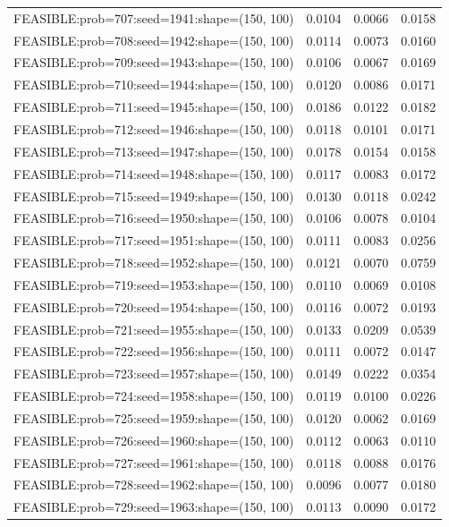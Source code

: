 \begin{longtable}{lccc}
FEASIBLE:prob=707:seed=1941:shape=(150, 100) &   0.0104 & 0.0066 & 0.0158 \\
FEASIBLE:prob=708:seed=1942:shape=(150, 100) &   0.0114 & 0.0073 & 0.0160 \\
FEASIBLE:prob=709:seed=1943:shape=(150, 100) &   0.0106 & 0.0067 & 0.0169 \\
FEASIBLE:prob=710:seed=1944:shape=(150, 100) &   0.0120 & 0.0086 & 0.0171 \\
FEASIBLE:prob=711:seed=1945:shape=(150, 100) &   0.0186 & 0.0122 & 0.0182 \\
FEASIBLE:prob=712:seed=1946:shape=(150, 100) &   0.0118 & 0.0101 & 0.0171 \\
FEASIBLE:prob=713:seed=1947:shape=(150, 100) &   0.0178 & 0.0154 & 0.0158 \\
FEASIBLE:prob=714:seed=1948:shape=(150, 100) &   0.0117 & 0.0083 & 0.0172 \\
FEASIBLE:prob=715:seed=1949:shape=(150, 100) &   0.0130 & 0.0118 & 0.0242 \\
FEASIBLE:prob=716:seed=1950:shape=(150, 100) &   0.0106 & 0.0078 & 0.0104 \\
FEASIBLE:prob=717:seed=1951:shape=(150, 100) &   0.0111 & 0.0083 & 0.0256 \\
FEASIBLE:prob=718:seed=1952:shape=(150, 100) &   0.0121 & 0.0070 & 0.0759 \\
FEASIBLE:prob=719:seed=1953:shape=(150, 100) &   0.0110 & 0.0069 & 0.0108 \\
FEASIBLE:prob=720:seed=1954:shape=(150, 100) &   0.0116 & 0.0072 & 0.0193 \\
FEASIBLE:prob=721:seed=1955:shape=(150, 100) &   0.0133 & 0.0209 & 0.0539 \\
FEASIBLE:prob=722:seed=1956:shape=(150, 100) &   0.0111 & 0.0072 & 0.0147 \\
FEASIBLE:prob=723:seed=1957:shape=(150, 100) &   0.0149 & 0.0222 & 0.0354 \\
FEASIBLE:prob=724:seed=1958:shape=(150, 100) &   0.0119 & 0.0100 & 0.0226 \\
FEASIBLE:prob=725:seed=1959:shape=(150, 100) &   0.0120 & 0.0062 & 0.0169 \\
FEASIBLE:prob=726:seed=1960:shape=(150, 100) &   0.0112 & 0.0063 & 0.0110 \\
FEASIBLE:prob=727:seed=1961:shape=(150, 100) &   0.0118 & 0.0088 & 0.0176 \\
FEASIBLE:prob=728:seed=1962:shape=(150, 100) &   0.0096 & 0.0077 & 0.0180 \\
FEASIBLE:prob=729:seed=1963:shape=(150, 100) &   0.0113 & 0.0090 & 0.0172 \\

\end{longtable}
